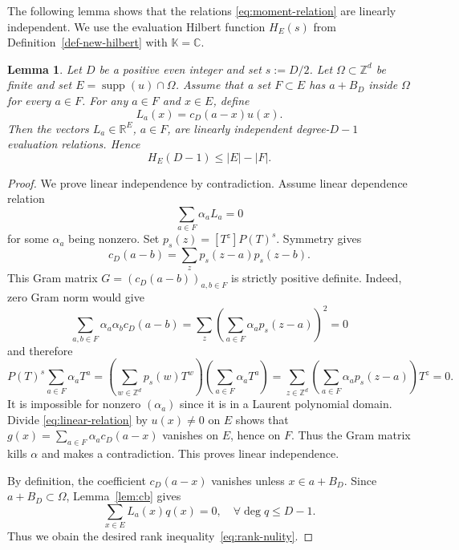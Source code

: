 \documentclass[11pt,reqno]{amsart}
\newcommand\K{\ensuremath{\mathbb{K}}}
\newcommand\R{\ensuremath{\mathbb{R}}}
\newcommand\Z{\ensuremath{\mathbb{Z}}}
\newcommand\C{\ensuremath{\mathbb{C}}}
\newcommand{\supp}{\operatorname{supp}}
\newtheorem{lemma}[theorem]{Lemma}
\theoremstyle{definition}
\theoremstyle{plain}
\numberwithin{equation}{section}
\begin{document}
The following lemma shows that the relations \eqref{eq:moment-relation} are linearly independent. We use the evaluation Hilbert function $H_E(s)$ from Definition~\ref{def-new-hilbert} with $\K=\C$.
\begin{lemma}\label{lem:gram}
    Let $D$ be a positive even integer and set
$s:=D/2$. Let $\Omega\subset \Z^d$ be finite and set $E=\supp(u)\cap\Omega$. Assume that a set $F\subset E$ has $a+B_D$ inside $\Omega$ for every $a\in F$. For any $a\in F$ and $x\in E$, define
    \begin{equation*}
        L_a(x)=c_D(a-x)u(x).
    \end{equation*}
    Then the vectors $L_a\in \R^{E}$, $a\in F$, are linearly independent degree-$D-1$ evaluation relations. Hence
    \begin{equation}\label{eq:rank-nulity}
        H_E(D-1)\le |E|-|F|.
    \end{equation}
\end{lemma}
\begin{proof}
We prove linear independence by contradiction. Assume linear dependence relation
\begin{equation}\label{eq:linear-relation}
    \sum_{a\in F}\alpha_a L_a=0
\end{equation}
for some $\alpha_a$ being nonzero.
    Set $p_s(z)=[T^z]P(T)^s$. Symmetry gives
    \begin{equation*}
        c_D(a-b)=\sum_{z}p_s(z-a)p_s(z-b).
    \end{equation*}
    This Gram matrix $G=(c_D(a-b))_{a,b\in F}$ is strictly positive definite. Indeed, zero Gram norm would give
    \begin{equation*}
         \sum_{a,b\in F}\alpha_a\alpha_b c_D(a-b)
 =\sum_z\left(\sum_{a\in F}\alpha_ap_s(z-a)\right)^2=0
    \end{equation*}
    and therefore
    \begin{equation*}
        P(T)^s\sum_{a\in F}\alpha_aT^a=\left(\sum_{w\in \Z^d}p_s(w)T^w\right)\left(\sum_{a\in F}\alpha_aT^a\right)
 =
 \sum_{z\in\Z^d}
 \left(\sum_{a\in F}\alpha_ap_s(z-a)\right)T^z=0.
    \end{equation*}
    It is impossible for nonzero $(\alpha_a)$ since it is in a Laurent polynomial domain. Divide \eqref{eq:linear-relation} by $u(x)\neq 0$ on $E$ shows that $g(x)=\sum_{a\in F}\alpha_a c_D(a-x)$ vanishes on $E$, hence on $F$. Thus the Gram matrix kills $\alpha$ and makes a contradiction. This proves linear independence.
    
    By definition, the coefficient $c_D(a-x)$ vanishes unless $x\in a+B_D$. Since $a+B_D\subset \Omega$, Lemma~\ref{lem:cb} gives 
    \begin{equation*}
        \sum_{x\in E}L_a(x)q(x)=0, \quad \forall \deg q \le D-1.
    \end{equation*}
    Thus we obain the desired rank inequality~\eqref{eq:rank-nulity}.
\end{proof}
\end{document}
